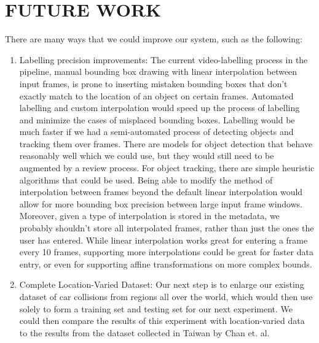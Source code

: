 \documentclass[letterpaper, 10 pt, conference]{ieeeconf}
\begin{document}
\section{FUTURE WORK}

There are many ways that we could improve our system, such as the following:
\begin{enumerate}
\item Labelling precision improvements: The current video-labelling process in the pipeline, manual bounding box drawing with linear interpolation between input frames, is prone to inserting mistaken bounding boxes that don't exactly match to the location of an object on certain frames. Automated labelling and custom interpolation would speed up the process of labelling and minimize the cases of misplaced bounding boxes. Labelling would be much faster if we had a semi-automated process of detecting objects and tracking them over frames. There are models for object detection that behave reasonably well which we could use, but they would still need to be augmented by a review process. For object tracking, there are simple heuristic algorithms that could be used. Being able to modify the method of interpolation between frames beyond the default linear interpolation would allow for more bounding box precision between large input frame windows. Moreover, given a type of interpolation is stored in the metadata, we probably shouldn't store all interpolated frames, rather than just the ones the user has entered. While linear interpolation works great for entering a frame every 10 frames, supporting more interpolations could be great for faster data entry, or even for supporting affine transformations on more complex bounds.

\item Complete Location-Varied Dataset: Our next step is to enlarge our existing dataset of car collisions from regions all over the world, which would then use solely to form a training set and testing set for our next experiment. We could then compare the results of this experiment with location-varied data to the results from the dataset collected in Taiwan by Chan et. al.

\end{enumerate}

\addtolength{\textheight}{-12cm}


\nocite{*}


\end{document}
